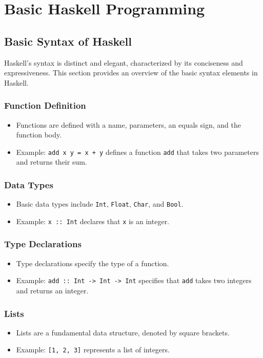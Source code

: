 \chapter{Basic Haskell Programming}

\section{Basic Syntax of Haskell}

Haskell's syntax is distinct and elegant, characterized by its conciseness and expressiveness. This section provides an overview of the basic syntax elements in Haskell.

\subsection{Function Definition}
\begin{itemize}
	\item Functions are defined with a name, parameters, an equals sign, and the function body.
	\item Example: \texttt{add x y = x + y} defines a function \texttt{add} that takes two parameters and returns their sum.
\end{itemize}

\subsection{Data Types}
\begin{itemize}
	\item Basic data types include \texttt{Int}, \texttt{Float}, \texttt{Char}, and \texttt{Bool}.
	\item Example: \texttt{x :: Int} declares that \texttt{x} is an integer.
\end{itemize}

\subsection{Type Declarations}
\begin{itemize}
	\item Type declarations specify the type of a function.
	\item Example: \texttt{add :: Int -> Int -> Int} specifies that \texttt{add} takes two integers and returns an integer.
\end{itemize}

\subsection{Lists}
\begin{itemize}
	\item Lists are a fundamental data structure, denoted by square brackets.
	\item Example: \texttt{[1, 2, 3]} represents a list of integers.
\end{itemize}

